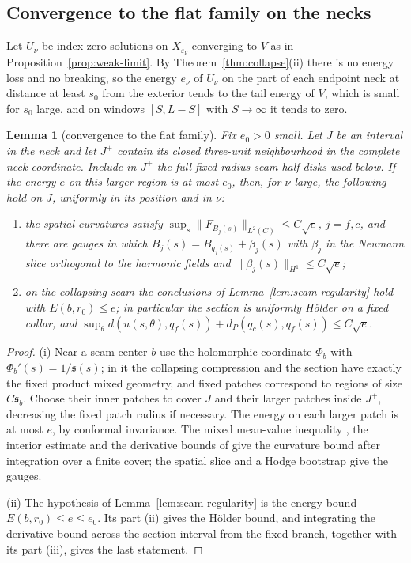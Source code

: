 \documentclass[11pt]{amsart}
\newtheorem{lemma}[theorem]{Lemma}
\theoremstyle{definition}
\theoremstyle{remark}
\theoremstyle{plain}
\numberwithin{equation}{section}
\newcommand{\eps}{\varepsilon}
\begin{document}
\subsection{Convergence to the flat family on the necks}

Let $U_\nu$ be index-zero solutions on $X_{\eps_\nu}$ converging to $V$
as in Proposition~\ref{prop:weak-limit}. By
Theorem~\ref{thm:collapse}(ii) there is no energy loss and no breaking,
so the energy $e_\nu$ of $U_\nu$ on the part of each endpoint neck at
distance at least $s_0$ from the exterior tends to the tail energy of $V$,
which is small for $s_0$ large, and on windows $[S,L-S]$ with
$S\to\infty$ it tends to zero.

\begin{lemma}[convergence to the flat family]\label{lem:entry}
Fix $e_0>0$ small. Let $J$ be an interval in the neck and let $J^+$
contain its closed three-unit neighbourhood in the complete neck
coordinate. Include in $J^+$ the full fixed-radius seam half-disks
used below. If the energy $e$ on this larger region is at most $e_0$,
then, for $\nu$ large, the following hold on $J$, uniformly in its
position and in $\nu$:
\begin{enumerate}[label=(\roman*)]
\item the spatial curvatures satisfy
  $\sup_s\|F_{B_j(s)}\|_{L^2(C)}\le C\sqrt{e}$, $j=f,c$, and there are
  gauges in which $B_j(s)=B_{q_j(s)}+\beta_j(s)$ with $\beta_j$ in the
  Neumann slice orthogonal to the harmonic fields and
  $\|\beta_j(s)\|_{H^1}\le C\sqrt e$;
\item on the collapsing seam the conclusions of
  Lemma~\ref{lem:seam-regularity} hold with $E(b,r_0)\le e$; in particular
  the section is uniformly Hölder on a fixed collar, and
  $\sup_\theta d(u(s,\theta),q_f(s))+d_P(q_c(s),q_f(s))\le C\sqrt e$.
\end{enumerate}
\end{lemma}

\begin{proof}
(i) Near a seam center $b$ use the holomorphic coordinate $\Phi_b$ with
$\Phi_b'(s)=1/{\mathfrak s}(s)$; in it the collapsing compression and the section
have exactly the fixed product mixed geometry, and fixed patches
correspond to regions of size $C{\mathfrak s}_b$. Choose their inner
patches to cover $J$ and their larger patches inside $J^+$, decreasing
the fixed patch radius if necessary. The energy on each larger patch
is at most $e$, by conformal invariance. The mixed mean-value inequality
\cite[Theorem~4.2]{DFL-mixed}, the interior estimate
\cite[Lemma~4.50]{DFL-mixed} and the derivative bounds of
\cite[Lemma~4.25]{DFL-mixed} give the curvature bound after integration
over a finite cover; the spatial slice and a Hodge bootstrap give the
gauges.

(ii) The hypothesis of Lemma~\ref{lem:seam-regularity} is the energy bound
$E(b,r_0)\le e\le e_0$. Its part (ii) gives the Hölder bound, and
integrating the derivative bound across the section interval from the
fixed branch, together with its part (iii), gives the last statement.
\end{proof}
\end{document}
